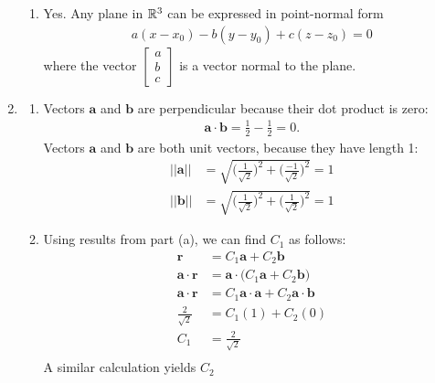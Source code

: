 \documentclass{article}
\begin{document}
\begin{enumerate}
\begin{enumerate}
\item Yes. Any plane in $\mathbb{R}^3$ can be expressed in point-normal form 
\begin{align*}
a(x-x_0) - b(y-y_0)+c(z-z_0) = 0
\end{align*}
where the vector $\begin{bmatrix} a \\ b \\ c \end{bmatrix}$ is a vector normal to the plane. 
\end{enumerate}

\item
\begin{enumerate}
\item Vectors $\mathbf{a}$ and $\mathbf{b}$ are perpendicular because their dot product is zero:
\begin{align*}
\mathbf{a} \cdot \mathbf{b} = \frac{1}{2} -  \frac{1}{2} =0.
\end{align*}
Vectors $\mathbf{a}$ and $\mathbf{b}$ are both unit vectors, because they have length 1:
\begin{align*}
|| \mathbf{a} || &=  \sqrt{ \Bigg( \frac{1}{\sqrt{2}}\Bigg)^2 +  \Bigg(\frac{-1}{\sqrt{2}}\Bigg)^2} = 1\\
|| \mathbf{b} || &=  \sqrt{ \Bigg( \frac{1}{\sqrt{2}}\Bigg)^2 +  \Bigg(\frac{1}{\sqrt{2}}\Bigg)^2} = 1
\end{align*}
\item Using results from part (a), we can find $C_1$ as follows:
\begin{align*}
\mathbf{r} &= C_1 \mathbf{a} + C_2  \mathbf{b} \\
\mathbf{a}\cdot\mathbf{r} &=  \mathbf{a}\cdot \Big(C_1 \mathbf{a} + C_2 \mathbf{b} \Big)\\
\mathbf{a}\cdot\mathbf{r} &= C_1 \mathbf{a}\cdot \mathbf{a} + C_2\mathbf{a}\cdot   \mathbf{b} \\
\frac{2}{\sqrt{2}} &= C_1 (1) + C_2(0) \\
C_1 &= \frac{2}{\sqrt{2}} \\
\end{align*}
A similar calculation yields $C_2$
\begin{align*}

\end{align*}
\end{enumerate}
\end{enumerate}
\end{document}
